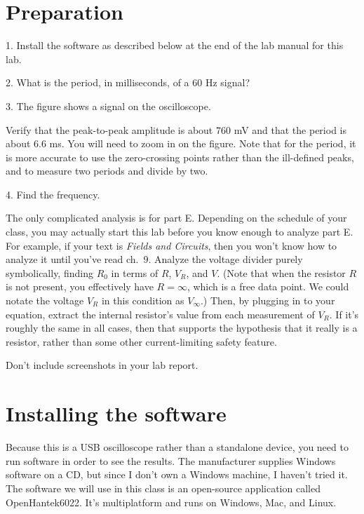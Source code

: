 \section*{Preparation}

1. Install the software as described below at the end of the lab manual for this lab.

2. What is the period, in milliseconds, of a 60 Hz signal?

3. The figure shows a signal on the oscilloscope.


Verify that the peak-to-peak amplitude is about 760 mV and that the period is about
6.6 ms. You will need to zoom in on the figure. Note that for the period, it is
more accurate to use the zero-crossing points rather than the ill-defined peaks,
and to measure two periods and divide by two.

4. Find the frequency.

\analysis

The only complicated analysis is for part E. Depending on the schedule of your class,
you may actually start this lab before you know enough to analyze part E. For example, if
your text is \emph{Fields and Circuits}, then you won't know how to analyze it until
you've read ch.~9.
Analyze the voltage divider purely symbolically, finding
$R_0$ in terms of $R$, $V_R$, and $V$. (Note that when the resistor $R$ is not present,
you effectively have $R=\infty$, which is a free data point. We could notate the
voltage $V_R$ in this condition as $V_\infty$.)
Then, by plugging in to your equation, extract the internal resistor's value from each
measurement of $V_R$. If it's roughly the same in all cases, then that supports the hypothesis that it
really is a resistor, rather than some other current-limiting safety feature.

Don't include screenshots in your lab report.

\section*{Installing the software}

Because this is a USB oscilloscope rather than a standalone device,
you need to run software in order to see the results. The manufacturer
supplies Windows software on a CD, but since I don't own a Windows machine,
I haven't tried it. The software we will use in this class is an open-source application
called OpenHantek6022.
It's multiplatform and runs on Windows, Mac, and Linux.

